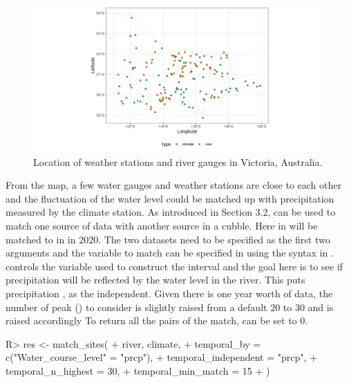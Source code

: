 \documentclass[
]{jss}
\begin{document}
\begin{CodeChunk}
\begin{figure}

{\centering \includegraphics[width=1\linewidth]{figures/matching-map} 

}

\caption[Location of weather stations and river gauges in Victoria, Australia]{Location of weather stations and river gauges in Victoria, Australia.}\label{fig:matching-map}
\end{figure}
\end{CodeChunk}

From the map, a few water gauges and weather stations are close to each
other and the fluctuation of the water level could be matched up with
precipitation measured by the climate station. As introduced in Section
3.2,  can be used to match one source of data with
another source in a cubble. Here  in
 will be matched to  in  in 2020.
The two datasets need to be specified as the first two arguments and the
variable to match can be specified in  using the
 syntax in .  controls
the variable used to construct the interval and the goal here is to see
if precipitation will be reflected by the water level in the river. This
puts precipitation , as the independent. Given there is one
year worth of data, the number of peak () to
consider is slightly raised from a default 20 to 30 and
 is raised accordingly To return all the pairs
of the match,  can be set to 0.

\begin{CodeChunk}
\begin{CodeInput}
R> res <- match_sites(
+   river, climate,
+   temporal_by = c("Water_course_level" = "prcp"),
+   temporal_independent = "prcp",  
+   temporal_n_highest = 30,
+   temporal_min_match = 15
+ )
\end{CodeInput}
\end{CodeChunk}
\end{document}
